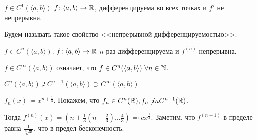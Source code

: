 \begin{definition}
    $f \in C^1(\langle a, b \rangle)$  $f\!: \langle a, b \rangle \to \mathbb{R}$, дифференцируема во всех точках и  $f'$ не непрерывна.

    Будем называть такое свойство <<непрерывной дифференцируемостью>>.
\end{definition}
\begin{definition}
    $f \in C^n(\langle a, b \rangle)$. $f\!: \langle a, b \rangle \to \mathbb{R}$  $n$ раз дифференцируема и  $f^{(n)}$ непрерывна.
\end{definition}
\begin{definition}
    $f \in C^{\infty}(\langle a, b \rangle)$ означает, что  $f \in C^n(\langle a, b \rangle)\ \forall n \in \mathbb{N}$.
\end{definition}
\begin{remark}
    $C^n(\langle a, b \rangle) \supsetneqq C^{n+1}(\langle a, b \rangle) \supset C^{\infty}(\langle a, b \rangle)$
\end{remark}
\begin{example}
    $f_n(x) \coloneqq x^{n + \frac{1}{3}}$. Покажем, что $f_n \in C^n(\mathbb{R}), f_n \not in C^{n+1}(\mathbb{R})$.

    Тогда  $f^{(n)}(x) = (n+\frac{1}{3}(n-\frac{2}{3})\ldots \frac{4}{3}) \eqqcolon cx^{\frac{1}{3}}$. Заметим, что $f^{(n+1)}$ в пределе равна  $\frac{1}{\sqrt[3]{x}}$, что в предел бесконечность.
\end{example}

